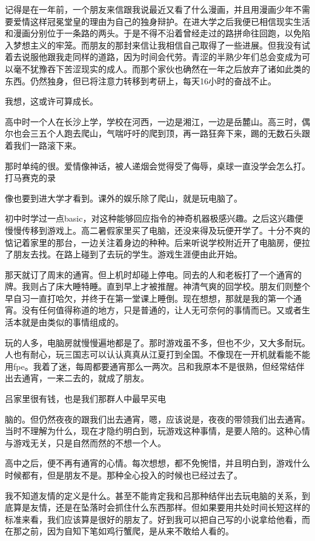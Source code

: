 \documentclass{article}
\begin{document}
记得是在一年前，一个朋友来信跟我说最近又看了什么漫画，并且用漫画少年不需要爱情这样冠冕堂皇的理由为自己的独身辩护。在进大学之后我便已相信现实生活和漫画分别位于一条路的两头。于是不得不沿着曾经走过的路拼命往回跑，以免陷入梦想主义的牢笼。而朋友的那封来信让我相信自己取得了一些进展。但我没有试着去说服他跟我走同样的道路，因为时间会代劳。青涩的半熟少年们总会变成为可以毫不犹豫吞下苦涩现实的成人。而那个家伙也确然在一年之后放弃了诸如此类的东西。仍然独身，但已将注意力转移到考研上，每天16小时的奋战不止。

我想，这或许可算成长。


高中时一个人在长沙上学，学校在河西，一边是湘江，一边是岳麓山。高三时，偶尔也会三五个人跑去爬山，气喘吁吁的爬到顶，再一路狂奔下来，踢的无数石头跟着我们一路滚下来。

那时单纯的很。爱情像神话，被人递烟会觉得受了侮辱，桌球一直没学会怎么打。打马赛克的录

\newpage 

像也要到进大学才看到。课外的娱乐除了爬山，就是玩电脑了。

初中时学过一点basic，对这种能够回应指令的神奇机器极感兴趣。之后这兴趣便慢慢传移到游戏上。高二暑假家里买了电脑，还没来得及玩便开学了。十分不爽的惦记着家里的那台，一边关注着身边的种种。后来听说学校附近开了电脑房，便拉了朋友去找。在路上碰到了去玩的学生。游戏生涯便由此开始。

那天就订了周末的通宵。但上机时却碰上停电。同去的人和老板打了一个通宵的牌。我则占了床大睡特睡。直到早上才被推醒。神清气爽的回学校。朋友们则整个早自习一直打哈欠，并终于在第一堂课上睡倒。现在想想，那就是我的第一个通宵。没有任何值得称道的地方，只是普通的，让人无可奈何的事情而已。又或者生活本就是由类似的事情组成的。


玩的人多，电脑房就慢慢遍地都是了。那时游戏虽不多，但也不少，又大多耐玩。人也有耐心，玩三国志可以认认真真从江夏打到全国。不像现在一开机就看能不能用fpe。我着了迷，每周都要通宵那么一两次。吕和我原本不是很熟，但经常结伴出去通宵，一来二去的，就成了朋友。

吕家里很有钱，也是我们那群人中最早买电

\newpage 

脑的。但仍然夜夜的跟我们出去通宵，嗯，应该说是，夜夜的带领我们出去通宵。当时不理解为什么，现在才隐约明白到，玩游戏这种事情，是要人陪的。这种心情与游戏无关，只是自然而然的不想一个人。

高中之后，便不再有通宵的心情。每次想想，都不免惋惜，并且明白到，游戏什么时候都有，但是朋友不是。那种全心投入的时候也已经过去了。


我不知道友情的定义是什么。甚至不能肯定我和吕那种结伴出去玩电脑的关系，到底算是友情，还是在坠落时会抓住什么东西那样。但如果要用共处时间长短这样的标准来看，我们应该算是很好的朋友了。好到我可以把自己写的小说拿给他看，而在那之前，因为自知下笔如鸡行蟹爬，是从来不敢给人看的。
\end{document}

